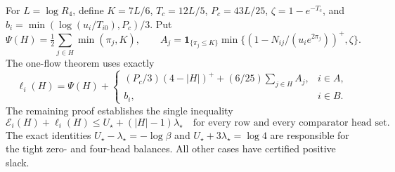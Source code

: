 For $L=\log R_4$, define $K=7L/6$, $T_c=12L/5$,
$P_c=43L/25$, $\zeta=1-e^{-T_c}$, and
$b_i=\min(\log(u_i/T_{i0}),P_c)/3$. Put
\[
 \Psi(H)=\tfrac12\sum_{j\in H}\min(\pi_j,K),\qquad
 A_j=\mathbf1_{\{\pi_j\le K\}}
       \min\{(1-N_{ij}/(u_i e^{2\pi_j}))^+,\zeta\}.
\]
The one-flow theorem uses exactly
\begin{equation}\label{eq:integration-row-ledger}
 \ell_i(H)=\Psi(H)+
 \begin{cases}(P_c/3)(4-|H|)^++(6/25)\sum_{j\in H}A_j,&i\in A,\\
 b_i,&i\in B.
 \end{cases}
\end{equation}
The remaining proof establishes the single inequality
\begin{equation}\label{eq:integration-scalar-interface}
 \mathcal E_i(H)+\ell_i(H)\le U_\star+(|H|-1)\lambda_\star
 \quad\text{for every row and every comparator head set.}
\end{equation}
The exact identities $U_\star-\lambda_\star=-\log\beta$ and
$U_\star+3\lambda_\star=\log4$ are responsible for the tight zero- and
four-head balances. All other cases have certified positive slack.
